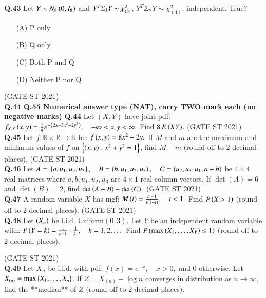 \documentclass[journal,12pt,onecolumn]{IEEEtran}
\theoremstyle{remark}
\begin{document}
\textbf{Q.43}
Let $Y \sim N_8\left(0,I_8\right)$ and $Y^T\Sigma_1Y \sim \chi^2_{\left(3\right)}$, $Y^T\Sigma_2Y \sim \chi^2_{(4)}$, independent. True?
\begin{enumerate}
\item[(A)] P only
\item[(B)] Q only
\item[(C)] Both P and Q
\item[(D)] Neither P nor Q
\end{enumerate}
\hfill (GATE ST 2021) \\

\textbf{Q.44 \text{-} Q.55 Numerical answer type   (NAT), carry TWO mark each (no negative marks)}
\textbf{Q.44}
Let $(X,Y)$ have joint pdf:
$
f_{X,Y}\left(x,y\right) = \frac{1}{\pi} e^{-\left(2x - 3x^2 - 2y^2\right)}, \quad -\infty < x,y < \infty.
$
Find $8 \, E\left(XY\right)$.
\hfill (GATE ST 2021) \\

\textbf{Q.45}
Let $f: \mathbb{R} \times \mathbb{R} \to \mathbb{R}$ be:
$
f\left(x,y\right)= 8x^2 - 2y.
$
If $M$ and $m$ are the maximum and minimum values of $f$ on $\left\{ \left(x,y\right) : x^2 + y^2 = 1 \right\}$,  
find $M - m$ (round off to 2 decimal places).
\hfill (GATE ST 2021) \\


\textbf{Q.46}
Let 
$
A = {}\left[a, u_1, u_2, u_3\right], \quad
B = \left(b, u_1, u_2, u_3\right), \quad
C = \left(u_2, u_3, u_1, a+b\right)
$
be $4\times 4$ real matrices where $a,b,u_1,u_2,u_3$ are $4 \times 1$ real column vectors.  
If $\det(A) = 6$ and $\det(B) = 2$, find $\det\left(A+B\right) - \det\left(C\right)$.
\hfill (GATE ST 2021) \\
\textbf{Q.47}
A random variable $X$ has mgf:
$
M\left(t\right) = \frac{e^t - 1}{t\left(1-t\right)}, \quad t < 1.
$
Find $P\left(X > 1\right)$ (round off to 2 decimal places).
\hfill (GATE ST 2021) \\
\textbf{Q.48}
Let $\left( X_n \right)$ be i.i.d. $\text{Uniform}(0,3)$.  
Let $Y$ be an independent random variable with:
$
P\left(Y = k\right) = \frac{1}{e-1} \cdot \frac{1}{k!}, \quad k = 1,2,\dots
$
Find $P\left( \max\left( X_1,\dots,X_Y \right) \le 1 \right)$ (round off to 2 decimal places).

\hfill (GATE ST 2021) \\


\textbf{Q.49}
Let  $X_n$ be i.i.d. with pdf:
$
f(x) = e^{-x}, \quad x > 0,
$
and $0$ otherwise.  
Let $X_{(n)} = \max\left\{ X_1,\dots,X_n \right\}$. If 
$
Z = X_{(n)} - \log n
$
converges in distribution as $n \to \infty$, find the **median** of $Z$ (round off to 2 decimal places).
\end{document}
